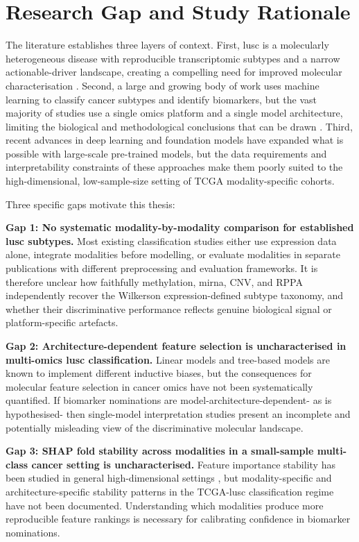 \section{Research Gap and Study Rationale}


The literature establishes three layers of context.
First, \gls{lusc} is a molecularly heterogeneous disease with reproducible transcriptomic subtypes and a narrow actionable-driver landscape, creating a compelling need for improved molecular characterisation \parencite{Wilkerson2010, Hammerman2012, Lau2022-hy}. Second, a large and growing body of work uses machine learning to classify cancer subtypes and identify biomarkers, but the vast majority of studies use a single omics platform and a single model architecture, limiting the biological and methodological conclusions that can be drawn \parencite{Picard2021, Nicora2020}. Third, recent advances in deep learning and foundation models have expanded what is possible with large-scale pre-trained models, but the data requirements and interpretability constraints of these approaches make them poorly suited to the high-dimensional, low-sample-size setting of TCGA modality-specific cohorts.
 
Three specific gaps motivate this thesis:
 
\textbf{Gap 1: No systematic modality-by-modality comparison for established \gls{lusc} subtypes.} Most existing classification studies either use expression data alone, integrate modalities before modelling, or evaluate modalities in separate publications with different preprocessing and evaluation frameworks. It is therefore unclear how faithfully methylation, \gls{mirna}, CNV, and RPPA independently recover the Wilkerson expression-defined subtype taxonomy, and whether their discriminative performance reflects genuine biological signal or platform-specific artefacts.
 
\textbf{Gap 2: Architecture-dependent feature selection is uncharacterised in multi-omics \gls{lusc} classification.} Linear models and tree-based models are known to implement different inductive biases, but the consequences for molecular feature selection in cancer omics have not been systematically quantified. If biomarker nominations are model-architecture-dependent- as is hypothesised- then single-model interpretation studies present an incomplete and potentially misleading view of the discriminative molecular landscape.
 
\textbf{Gap 3: SHAP fold stability across modalities in a small-sample multi-class cancer setting is uncharacterised.} Feature importance stability has been studied in general high-dimensional settings \parencite{Kalousis2007}, but modality-specific and architecture-specific stability patterns in the TCGA-\gls{lusc} classification regime have not been documented. Understanding which modalities produce more reproducible feature rankings is necessary for calibrating confidence in biomarker nominations.
 
